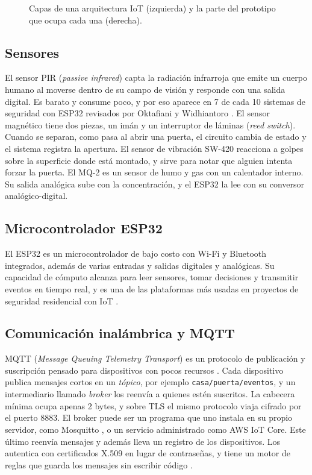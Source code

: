 \documentclass[manuscript,screen,nonacm]{acmart}
\begin{document}
\begin{figure}[htbp]
\centering

\caption{Capas de una arquitectura IoT (izquierda) y la parte del prototipo que ocupa cada una (derecha).}
\label{fig:capas}
\end{figure}

\subsection{Sensores}
El sensor PIR (\emph{passive infrared}) capta la radiación infrarroja que emite un cuerpo humano al moverse dentro de su campo de visión y responde con una salida digital. Es barato y consume poco, y por eso aparece en 7 de cada 10 sistemas de seguridad con ESP32 revisados por Oktafiani y Widhiantoro \cite{oktafiani2025esp32}. El sensor magnético tiene dos piezas, un imán y un interruptor de láminas (\emph{reed switch}). Cuando se separan, como pasa al abrir una puerta, el circuito cambia de estado y el sistema registra la apertura. El sensor de vibración SW-420 reacciona a golpes sobre la superficie donde está montado, y sirve para notar que alguien intenta forzar la puerta. El MQ-2 es un sensor de humo y gas con un calentador interno. Su salida analógica sube con la concentración, y el ESP32 la lee con su conversor analógico-digital.

\subsection{Microcontrolador ESP32}
El ESP32 es un microcontrolador de bajo costo con Wi-Fi y Bluetooth integrados, además de varias entradas y salidas digitales y analógicas. Su capacidad de cómputo alcanza para leer sensores, tomar decisiones y transmitir eventos en tiempo real, y es una de las plataformas más usadas en proyectos de seguridad residencial con IoT \cite{oktafiani2025esp32, nannung2025iot}.

\subsection{Comunicación inalámbrica y MQTT}
MQTT (\emph{Message Queuing Telemetry Transport}) es un protocolo de publicación y suscripción pensado para dispositivos con pocos recursos \cite{alfuqaha2015survey, light2017mosquitto}. Cada dispositivo publica mensajes cortos en un \emph{tópico}, por ejemplo \texttt{casa/puerta/eventos}, y un intermediario llamado \emph{broker} los reenvía a quienes estén suscritos. La cabecera mínima ocupa apenas 2 bytes, y sobre TLS el mismo protocolo viaja cifrado por el puerto 8883. El broker puede ser un programa que uno instala en su propio servidor, como Mosquitto \cite{light2017mosquitto}, o un servicio administrado como AWS IoT Core. Este último reenvía mensajes y además lleva un registro de los dispositivos. Los autentica con certificados X.509 en lugar de contraseñas, y tiene un motor de reglas que guarda los mensajes sin escribir código \cite{aws2026iot}.
\end{document}
